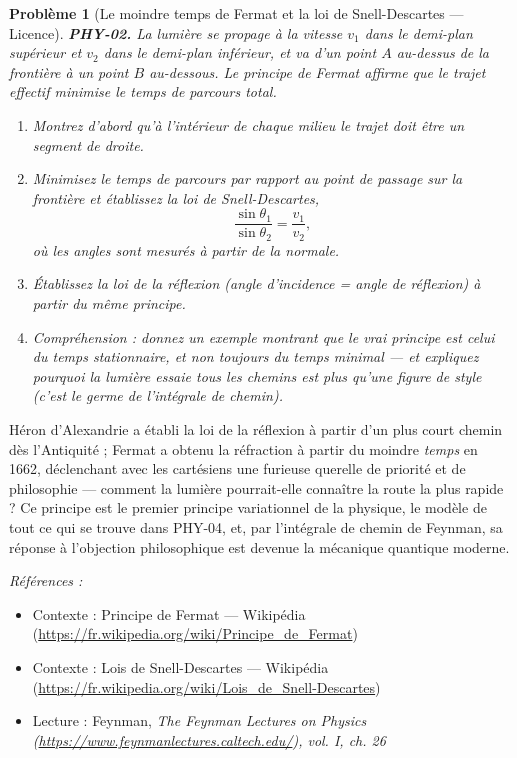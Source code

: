 \documentclass[11pt]{article}
\newtheorem{problem}{Problème}
\newenvironment{refs}{\par\small\noindent\emph{Références :}\begin{itemize}\setlength\itemsep{0pt}}{\end{itemize}\normalsize}
\begin{document}
\bigskip

\begin{problem}[{Le moindre temps de Fermat et la loi de Snell-Descartes --- Licence}]
\textbf{PHY-02.} La lumière se propage à la vitesse $v_1$ dans le demi-plan supérieur et
$v_2$ dans le demi-plan inférieur, et va d'un point $A$ au-dessus de la frontière à un point
$B$ au-dessous. Le principe de Fermat affirme que le trajet effectif minimise le temps de
parcours total.
\begin{enumerate}
\item[(a)] Montrez d'abord qu'à l'intérieur de chaque milieu le trajet doit être un segment de
droite.
\item[(b)] Minimisez le temps de parcours par rapport au point de passage sur la frontière et établissez
la loi de Snell-Descartes,
\[ \frac{\sin\theta_1}{\sin\theta_2} = \frac{v_1}{v_2}, \]
où les angles sont mesurés à partir de la normale.
\item[(c)] Établissez la loi de la réflexion (angle d'incidence = angle de réflexion) à partir du même
principe.
\item[(d)] Compréhension : donnez un exemple montrant que le vrai principe est celui du temps
stationnaire, et non toujours du temps minimal --- et expliquez pourquoi \og{} la lumière essaie tous
les chemins \fg{} est plus qu'une figure de style (c'est le germe de l'intégrale de chemin).
\end{enumerate}

\end{problem}

\noindent Héron d'Alexandrie a établi la loi de la réflexion à partir d'un plus court
chemin dès l'Antiquité ; Fermat a obtenu la réfraction à partir du moindre \textit{temps} en 1662,
déclenchant avec les cartésiens une furieuse querelle de priorité et de philosophie --- comment la
lumière pourrait-elle \og{} connaître \fg{} la route la plus rapide ? Ce principe est le premier principe
variationnel de la physique, le modèle de tout ce qui se trouve dans PHY-04, et, par l'intégrale
de chemin de Feynman, sa réponse à l'objection philosophique est devenue la mécanique quantique
moderne.

\begin{refs}
\item Contexte : Principe de Fermat --- Wikipédia (\url{https://fr.wikipedia.org/wiki/Principe_de_Fermat})
\item Contexte : Lois de Snell-Descartes --- Wikipédia (\url{https://fr.wikipedia.org/wiki/Lois_de_Snell-Descartes})
\item Lecture : Feynman, \textit{The Feynman Lectures on Physics (\url{https://www.feynmanlectures.caltech.edu/}), vol. I, ch. 26}
\end{refs}
\end{document}
